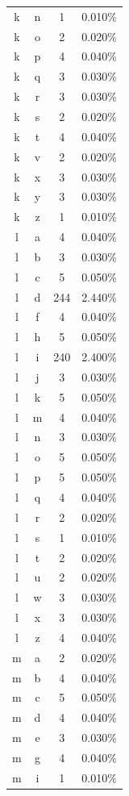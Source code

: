 \begin{longtable}{cccc}
    k & n & 1 & 0.010\% \\
    k & o & 2 & 0.020\% \\
    k & p & 4 & 0.040\% \\
    k & q & 3 & 0.030\% \\
    k & r & 3 & 0.030\% \\
    k & s & 2 & 0.020\% \\
    k & t & 4 & 0.040\% \\
    k & v & 2 & 0.020\% \\
    k & x & 3 & 0.030\% \\
    k & y & 3 & 0.030\% \\
    k & z & 1 & 0.010\% \\
    l & a & 4 & 0.040\% \\
    l & b & 3 & 0.030\% \\
    l & c & 5 & 0.050\% \\
    l & d & 244 & 2.440\% \\
    l & f & 4 & 0.040\% \\
    l & h & 5 & 0.050\% \\
    l & i & 240 & 2.400\% \\
    l & j & 3 & 0.030\% \\
    l & k & 5 & 0.050\% \\
    l & m & 4 & 0.040\% \\
    l & n & 3 & 0.030\% \\
    l & o & 5 & 0.050\% \\
    l & p & 5 & 0.050\% \\
    l & q & 4 & 0.040\% \\
    l & r & 2 & 0.020\% \\
    l & s & 1 & 0.010\% \\
    l & t & 2 & 0.020\% \\
    l & u & 2 & 0.020\% \\
    l & w & 3 & 0.030\% \\
    l & x & 3 & 0.030\% \\
    l & z & 4 & 0.040\% \\
    m & a & 2 & 0.020\% \\
    m & b & 4 & 0.040\% \\
    m & c & 5 & 0.050\% \\
    m & d & 4 & 0.040\% \\
    m & e & 3 & 0.030\% \\
    m & g & 4 & 0.040\% \\
    m & i & 1 & 0.010\% \\

\end{longtable}
